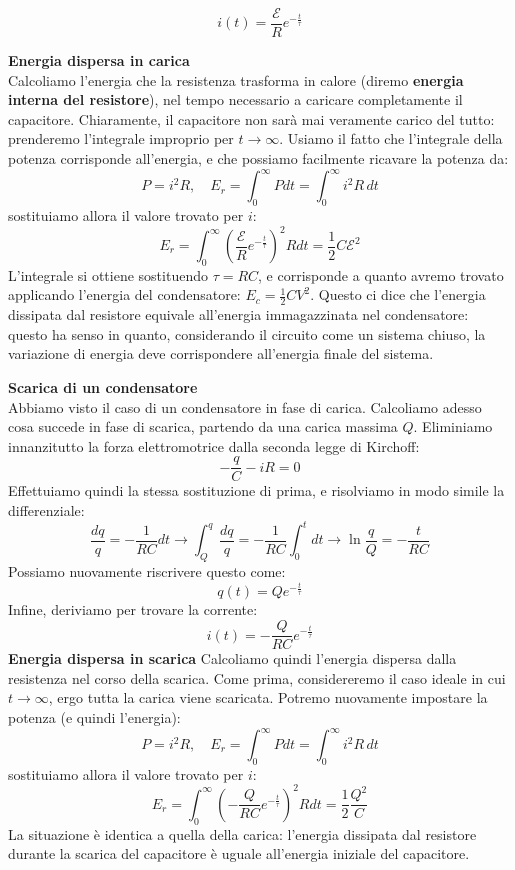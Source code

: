 \documentclass[a4paper,12pt]{article}
\begin{document}
$$ i(t) = \frac{\mathcal{E}}{R}e^{-\frac{t}{\tau}}$$
\par\smallskip
\textbf{Energia dispersa in carica} \\
Calcoliamo l'energia che la resistenza trasforma in calore (diremo \textbf{energia interna del resistore}), nel tempo necessario a caricare
completamente il capacitore. Chiaramente, il capacitore non sarà mai veramente carico del tutto: prenderemo l'integrale improprio per $t\rightarrow\infty$. Usiamo il fatto
che l'integrale della potenza corrisponde all'energia, e che possiamo facilmente ricavare la potenza da:
$$ P = i^2 R, \quad E_r = \int_0^\infty Pdt = \int_0^\infty i^2R\,dt$$
sostituiamo allora il valore trovato per $i$:
$$ E_r = \int_0^\infty \left( \frac{\mathcal{E}}{R}e^{-\frac{t}{\tau}}\right)^2Rdt = \frac{1}{2}C\mathcal{E}^2$$
L'integrale si ottiene sostituendo $\tau = RC$, e corrisponde a quanto avremo trovato applicando l'energia del condensatore: $E_c = \frac{1}{2}CV^2$.
Questo ci dice che l'energia dissipata dal resistore equivale all'energia immagazzinata nel condensatore: questo ha senso in quanto, considerando
il circuito come un sistema chiuso, la variazione di energia deve corrispondere all'energia finale del sistema.
\par\smallskip
\textbf{Scarica di un condensatore} \\
Abbiamo visto il caso di un condensatore in fase di carica. Calcoliamo adesso cosa succede in fase di scarica, partendo da una carica massima $Q$. Eliminiamo innanzitutto
la forza elettromotrice dalla seconda legge di Kirchoff:
$$ -\frac{q}{C} - iR = 0 $$
Effettuiamo quindi la stessa sostituzione di prima, e risolviamo in modo simile la differenziale:
$$ \frac{dq}{q} = -\frac{1}{RC}dt \rightarrow \int_Q^q \frac{dq}{q} = -\frac{1}{RC} \int_0^t dt \rightarrow \ln{\frac{q}{Q}} = -\frac{t}{RC} $$
Possiamo nuovamente riscrivere questo come:
$$ q(t) = Qe^{-\frac{t}{\tau}}$$
Infine, deriviamo per trovare la corrente:
$$ i(t) = -\frac{Q}{RC}e^{-\frac{t}{\tau}} $$
\textbf{Energia dispersa in scarica}
Calcoliamo quindi l'energia dispersa dalla resistenza nel corso della scarica. Come prima, considereremo il caso ideale in cui $t\rightarrow \infty$, ergo
tutta la carica viene scaricata. Potremo nuovamente impostare la potenza (e quindi l'energia):
$$ P = i^2 R, \quad E_r = \int_0^\infty Pdt = \int_0^\infty i^2R\,dt$$
sostituiamo allora il valore trovato per $i$:
$$ E_r = \int_0^\infty \left( -\frac{Q}{RC}e^{-\frac{t}{\tau}}\right)^2Rdt = \frac{1}{2}\frac{Q^2}{C}$$
La situazione è identica a quella della carica: l'energia dissipata dal resistore durante la scarica del capacitore è uguale all'energia iniziale
del capacitore.
\end{document}
